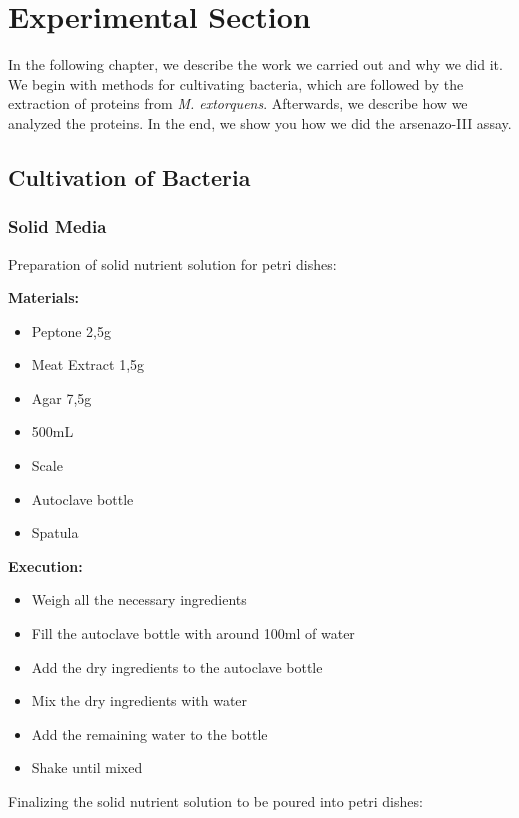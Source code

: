 \chapter{Experimental Section}

In the following chapter, we describe the work we carried out and why we did it.
We begin with methods for cultivating bacteria, which are followed by the extraction of proteins from \emph{M. extorquens}.
Afterwards, we describe how we analyzed the proteins.
In the end, we show you how we did the arsenazo-III assay.


\section{Cultivation of Bacteria\authorB}

\subsection{Solid Media}

Preparation of solid nutrient solution for petri dishes:

\textbf{Materials:}

\begin{itemize}
    \item Peptone 2,5g
    \item Meat Extract 1,5g
    \item Agar 7,5g
    \item {} 500mL
    \item Scale
    \item Autoclave bottle
    \item Spatula
\end{itemize}


\textbf{Execution:}
\begin{itemize}
    \item Weigh all the necessary ingredients
    \item Fill the autoclave bottle with around 100ml of water
    \item Add the dry ingredients to the autoclave bottle
    \item Mix the dry ingredients with water
    \item Add the remaining water to the bottle
    \item Shake until mixed
\end{itemize}


Finalizing the solid nutrient solution to be poured into petri dishes:

